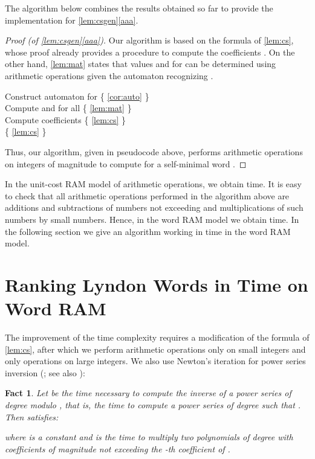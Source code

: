 \documentclass{article}
\newcommand{\mayqed}{}
\newenvironment{myalgorithm}[2][htbp]
   {\setlength{\algomargin}{.2cm}
     \begin{center}
     \begin{minipage}{#2}
     \begin{algorithm2e}[#1]
     \small
      \let\Par=\par
        \def\par{\endgraf\vspace{.1cm}}
            \SetKw{To}{to}\SetKw{Downto}{downto}\SetKw{Or}{or}\SetKwFor{Algo}{Algorithm}{}{}\vspace{.15cm}}
    {\let\par=\Par\end{algorithm2e}\end{minipage}\end{center}}
\newtheorem{fact}[theorem]{Fact}
\theoremstyle{definition}
\theoremstyle{remark}
\begin{document}
\noindent
The algorithm below combines the results obtained so far to provide the implementation for \cref{lem:csgen}\ref{aaa}.

\begin{proof}[Proof (of \cref{lem:csgen}\ref{aaa})]
Our algorithm is based on the formula of \cref{lem:cs},
whose proof already provides a procedure to compute the coefficients .
On the other hand, \cref{lem:mat} states that values  and  for 
can be determined using  arithmetic operations given the automaton recognizing .

\begin{myalgorithm}[H]{13 cm}
  {
    Construct automaton  for  \{ \cref{cor:auto} \}\\
    Compute  and  for all  \{ \cref{lem:mat} \}\\
    Compute  coefficients \{ \cref{lem:cs} \}\\
     \{ \cref{lem:cs} \}
  }
\end{myalgorithm}

Thus, our algorithm, given in pseudocode above, performs  arithmetic operations on integers of magnitude  to compute 
for a self-minimal word .
\mayqed\end{proof}

In the unit-cost RAM model of arithmetic operations, we obtain  time.
It is easy to check that all arithmetic operations performed in the algorithm above
are additions and subtractions of numbers not exceeding 
and multiplications of such numbers by small numbers.
Hence, in the word RAM model we obtain  time.
In the following section we give an algorithm working in  time in the word RAM model.







\section{Ranking Lyndon Words in  Time on Word RAM}\label{sec:wordram}
The improvement of the time complexity requires a modification of the formula
of \cref{lem:cs}, after which we perform  arithmetic operations only on small integers
and only  operations on large integers.
We also use Newton's iteration for power series inversion (\cite{Sieveking}; see also \cite[p.\ 140]{GeddesCL}):

\begin{fact}\label{fct:reciprocal}
  Let  be the time necessary to compute the inverse of a power series  of degree  modulo ,
  that is, the time to compute a power series  of degree  such that .
  Then  satisfies:
  
  where  is a constant and  is the time to multiply two polynomials of degree 
  with coefficients of magnitude not exceeding the -th coefficient of .
\end{fact}
\end{document}
